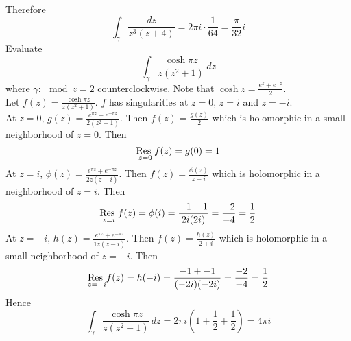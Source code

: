 \documentclass[12pt]{article}
\begin{document}
Therefore $$ \int_\gamma \frac{dz}{z^3(z+4)} = 2\pi i \cdot \frac{1}{64} = \frac{\pi}{32}i $$ 
Evaluate $$ \int_\gamma \frac{\cosh \pi z}{z(z^2 + 1)} \, dz $$ where $\gamma: \mod{z} = 2$ counterclockwise. Note that $\cosh z = \frac{e^z + e^{-z}}{2}$. \\
Let $f(z) = \frac{\cosh \pi z}{z(z^2 + 1)}$. $f$ has singularities at $z=0$, $z=i$ and $z=-i$. \\
At $z=0$, $g(z) = \frac{e^{\pi z} + e^{-\pi z}}{2(z^2 + 1)}$. Then $f(z) = \frac{g(z)}{2}$ which is holomorphic in a small neighborhood of $z=0$. Then $$ \underset{z=0}{\text{Res }} f(z) = g(0) = 1 $$ 
At $z=i$, $\phi(z) = \frac{e^{\pi z} + e^{-\pi z}}{2z(z+i)}$. Then $f(z) = \frac{\phi(z)}{z-i}$ which is holomorphic in a neighborhood of $z=i$. Then $$ \underset{z=i}{\text{Res }} f(z) = \phi(i) = \frac{-1-1}{2i(2i)} = \frac{-2}{-4} = \frac{1}{2}$$ 
At $z=-i$, $h(z) = \frac{e^{\pi z} + e^{-\pi z}}{1z(z-i)}$. Then $f(z) = \frac{h(z)}{2+i}$ which is holomorphic in a small neighborhood of $z=-i$. Then $$ \underset{z=-i}{\text{Res }} f(z) = h(-i) = \frac{-1 + -1}{(-2i)(-2i)} = \frac{-2}{-4} = \frac{1}{2}$$ 
Hence $$ \int_\gamma \frac{\cosh \pi z}{z(z^2 + 1)} \, dz = 2\pi i(1 + \frac{1}{2} + \frac{1}{2}) = 4\pi i $$ 
\end{document}

